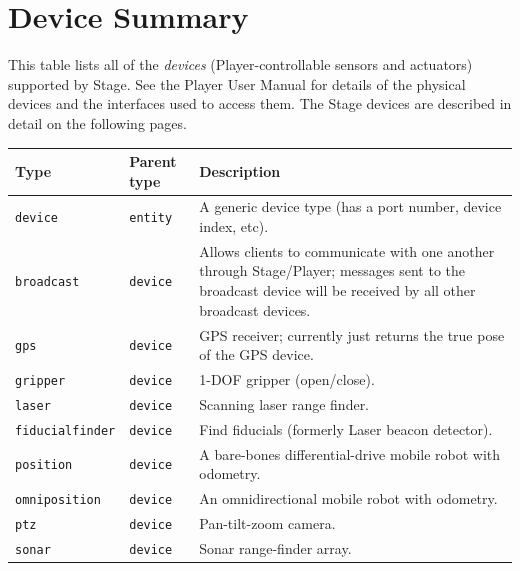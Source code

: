 \documentclass[11pt,twoside]{report}
\begin{document}
\newpage
\section{Device Summary}
\label{sec.ref.devices}

This table lists all of the {\em devices} (Player-controllable sensors
and actuators) supported by Stage.  See the Player User Manual for
details of the physical devices and the interfaces used to access
them. The Stage devices are described in detail on the following
pages.
\vspace{1em}\\\noindent
\begin{tabularx}{\columnwidth}{llX}
\hline 
Type & Parent type & Description \\
\hline

\verb'device' & \verb'entity' & A generic device type (has a port
number, device index, etc). \\

\hline

\verb'broadcast' & \verb'device' & Allows clients to communicate with
one another through Stage/Player; messages sent to the broadcast
device will be received by all other broadcast devices.\\

\verb'gps' & \verb'device' & GPS receiver; currently just returns the
true pose of the GPS device.\\

\verb'gripper' & \verb'device' & 1-DOF gripper (open/close).\\

\verb'laser' & \verb'device' & Scanning laser range finder.\\

\verb'fiducialfinder' & \verb'device' & Find fiducials (formerly Laser
beacon detector).\\

\verb'position' & \verb'device' & A bare-bones differential-drive
mobile robot with odometry.\\

\verb'omniposition' & \verb'device' & An omnidirectional mobile robot
with odometry.\\

\verb'ptz' & \verb'device' & Pan-tilt-zoom camera. \\

\verb'sonar' & \verb'device' & Sonar range-finder array.\\


\end{tabularx}
\end{document}
